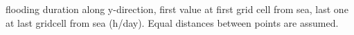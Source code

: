 flooding duration along y-\/direction, first value at first grid cell from sea, last one at last gridcell from sea (h/day). Equal distances between points are assumed. 